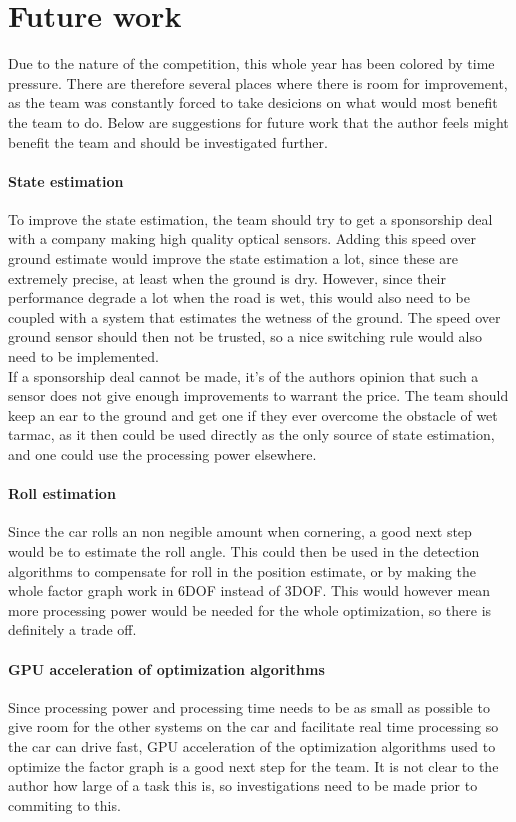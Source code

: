 \chapter{Future work}
Due to the nature of the competition, this whole year has been colored by time pressure. There are therefore several places where there is room for improvement, as the team was constantly forced to take desicions on what would most benefit the team to do. Below are suggestions for future work that the author feels might benefit the team and should be investigated further.

\subsubsection{State estimation}
To improve the state estimation, the team should try to get a sponsorship deal with a company making high quality optical sensors. Adding this speed over ground estimate would improve the state estimation a lot, since these are extremely precise, at least when the ground is dry. However, since their performance degrade a lot when the road is wet, this would also need to be coupled with a system that estimates the wetness of the ground. The speed over ground sensor should then not be trusted, so a nice switching rule would also need to be implemented. \\

If a sponsorship deal cannot be made, it's of the authors opinion that such a sensor does not give enough improvements to warrant the price. The team should keep an ear to the ground and get one if they ever overcome the obstacle of wet tarmac, as it then could be used directly as the only source of state estimation, and one could use the processing power elsewhere.

\subsubsection{Roll estimation}
Since the car rolls an non negible amount when cornering, a good next step would be to estimate the roll angle. This could then be used in the detection algorithms to compensate for roll in the position estimate, or by making the whole factor graph work in 6DOF instead of 3DOF. This would however mean more processing power would be needed for the whole optimization, so there is definitely a trade off.

\subsubsection{GPU acceleration of optimization algorithms}
Since processing power and processing time needs to be as small as possible to give room for the other systems on the car and facilitate real time processing so the car can drive fast, GPU acceleration of the optimization algorithms used to optimize the factor graph is a good next step for the team. It is not clear to the author how large of a task this is, so investigations need to be made prior to commiting to this.\\ 

